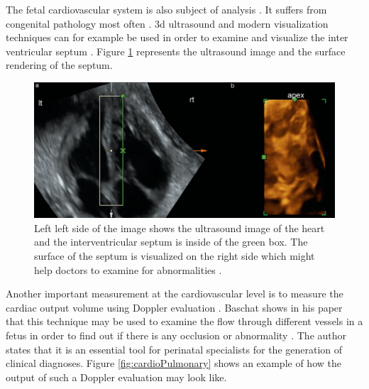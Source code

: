 The fetal cardiovascular system is also subject of analysis \cite{Yagel2007,Baschat2011ExaminationSystem,Dong2013PreliminaryAnomalies}. It suffers from congenital pathology most often \cite{Dong2013PreliminaryAnomalies}. \gls{3d} ultrasound and modern visualization techniques can for example be used in order to examine and visualize the inter ventricular septum \cite{Yagel2007}. Figure \ref{fig:septum} represents the ultrasound image and the surface rendering of the septum.

\begin{figure} [htb!]
    \centering
	\includegraphics[width=13cm]{content/images/septum}
	\caption{Left left side of the image shows the ultrasound image of the heart and the interventricular septum is inside of the green box. The surface of the septum is visualized on the right side which might help doctors to examine for abnormalities \cite{Yagel2007}.}
	\label{fig:septum}
\end{figure}

Another important measurement at the cardiovascular level is to measure the cardiac output volume using Doppler evaluation \cite{Baschat2011ExaminationSystem}. Baschat shows in his paper that this technique may be used to examine the flow through different vessels in a fetus in order to find out if there is any occlusion or abnormality \cite{Baschat2011ExaminationSystem}. The author states that it is an essential tool for perinatal specialists for the generation of clinical diagnoses. Figure \ref{fig:cardioPulmonary} shows an example of how the output of such a Doppler evaluation may look like.


